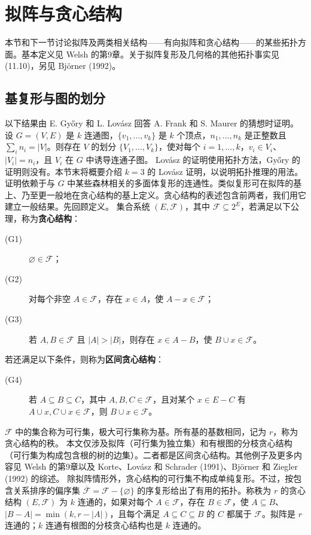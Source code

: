\setcounter{section}{5}
\section{拟阵与贪心结构}
本节和下一节讨论拟阵及两类相关结构——有向拟阵和贪心结构——的某些拓扑方面。基本定义见 Welsh 的第9章。关于拟阵复形及几何格的其他拓扑事实见(11.10)，另见 Björner (1992)。
\subsection*{基复形与图的划分}
以下结果由 E. Győry 和 L. Lovász 回答 A. Frank 和 S. Maurer 的猜想时证明。
设 $G=(V,E)$ 是 $k$ 连通图，$\{v_1,\ldots,v_k\}$ 是 $k$ 个顶点，$n_1,\ldots,n_k$ 是正整数且 $\sum_i n_i=|V|$。则存在 $V$ 的划分 $\{V_1,\ldots,V_k\}$，使对每个 $i=1,\ldots,k$，$v_i\in V_i$、$|V_i|=n_i$，且 $V_i$ 在 $G$ 中诱导连通子图。
Lovász 的证明使用拓扑方法，Győry 的证明则没有。本节末将概要介绍 $k=3$ 的 Lovász 证明，以说明拓扑推理的用法。证明依赖于与 $G$ 中某些森林相关的多面体复形的连通性。类似复形可在拟阵的基上、乃至更一般地在贪心结构的基上定义。贪心结构的表述包含前两者，我们用它建立一般结果。先回顾定义。
集合系统 $(E,\mathcal F)$，其中 $\mathcal F\subseteq2^E$，若满足以下公理，称为\textbf{贪心结构}：
\begin{description}
\item[(G1)] $\varnothing\in\mathcal F$；
\item[(G2)] 对每个非空 $A\in\mathcal F$，存在 $x\in A$，使 $A- x\in\mathcal F$；
\item[(G3)] 若 $A,B\in\mathcal F$ 且 $|A|>|B|$，则存在 $x\in A-B$，使 $B\cup x\in\mathcal F$。
\end{description}
若还满足以下条件，则称为\textbf{区间贪心结构}：
\begin{description}\item[(G4)] 若 $A\subseteq B\subseteq C$，其中 $A,B,C\in\mathcal F$，且对某个 $x\in E-C$ 有 $A\cup x,C\cup x\in\mathcal F$，则 $B\cup x\in\mathcal F$。\end{description}
$\mathcal F$ 中的集合称为可行集，极大可行集称为基。所有基的基数相同，记为 $r$，称为贪心结构的秩。
本文仅涉及拟阵（可行集为独立集）和有根图的分枝贪心结构（可行集为构成包含根的树的边集）。二者都是区间贪心结构。其他例子及更多内容见 Welsh 的第9章以及 Korte、Lovász 和 Schrader (1991)、Björner 和 Ziegler (1992) 的综述。
除拟阵情形外，贪心结构的可行集不构成单纯复形。不过，按包含关系排序的偏序集 $\overline{\mathcal F}=\mathcal F-\{\varnothing\}$ 的序复形给出了有用的拓扑。称秩为 $r$ 的贪心结构 $(E,\mathcal F)$ 为 $k$ 连通的，如果对每个 $A\in\mathcal F$，存在 $B\in\mathcal F$，使 $A\subseteq B$、$|B-A|=\min(k,r-|A|)$，且每个满足 $A\subseteq C\subseteq B$ 的 $C$ 都属于 $\mathcal F$。拟阵是 $r$ 连通的；$k$ 连通有根图的分枝贪心结构也是 $k$ 连通的。

